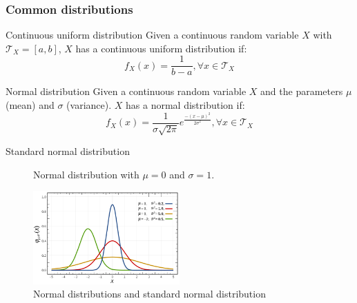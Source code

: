 \subsubsection{Common distributions}
\begin{descriptionlist}
    \item[Continuous uniform distribution] 
        Given a continuous random variable $X$ with $\mathcal{T}_X = [a, b]$,
        $X$ has a continuous uniform distribution if:
        \[ f_X(x) = \frac{1}{b-a}, \forall x \in \mathcal{T}_X \]
    
    \item[Normal distribution] 
        Given a continuous random variable $X$ and the parameters $\mu$ (mean) and $\sigma$ (variance).
        $X$ has a normal distribution if:
        \[ f_X(x) = \frac{1}{\sigma \sqrt{2\pi}} e^{\frac{-(x-\mu)^2}{2\sigma^2}} , \forall x \in \mathcal{T}_X\]

        \begin{description}
            \item[Standard normal distribution] 
                Normal distribution with $\mu = 0$ and $\sigma = 1$.
        \end{description}

        \begin{figure}[ht]
            \centering
            \includegraphics[width=0.5\textwidth]{img/normal_distribution.png}
            \caption{Normal distributions and standard normal distribution}
        \end{figure}
\end{descriptionlist}